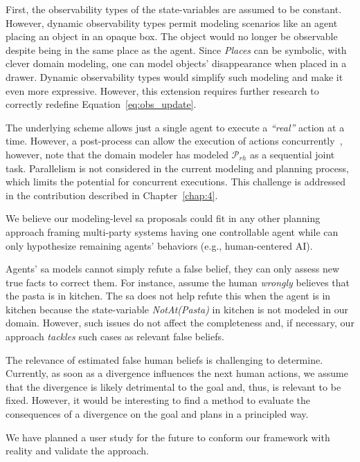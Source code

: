 {First, the observability types of the state-variables are assumed to be constant. 
However, dynamic observability types permit modeling scenarios like an agent placing an object in an opaque box. The object would no longer be observable despite being in the same place as the agent. Since \textit{Places} can be symbolic, with clever domain modeling, one can model objects' disappearance when placed in a drawer. Dynamic observability types would simplify such modeling and make it even more expressive. However, this extension requires further research to correctly redefine Equation~\ref{eq:obs_update}. 

The underlying scheme allows just a single agent to execute a \textit{``real''} action at a time. 
However, a post-process can allow the execution of actions concurrently~\cite{CrosbyJR14}, however, note that the domain modeler has modeled $\mathcal{P}_{rh}$ as a sequential joint task. 
Parallelism is not considered in the current modeling and planning process, which limits the potential for concurrent executions. This challenge is addressed in the contribution described in Chapter~\ref{chap:4}.

We believe our modeling-level \acrshort{sa} proposals could fit in any other planning approach framing multi-party systems having one controllable agent while can only hypothesize remaining agents' behaviors (e.g., human-centered AI).

Agents' \acrshort{sa} models cannot simply refute a false belief, they can only assess new true facts to correct them.
For instance, assume the human \textit{wrongly} believes that the pasta is in \textsf{kitchen}. The \acrshort{sa} does not help refute this when the agent is in \textsf{kitchen}
because the state-variable \textit{NotAt(Pasta)} in \textsf{kitchen} is not modeled in our domain.  
However, such issues do not affect the completeness and, if necessary, our approach \textit{tackles} such cases as relevant false beliefs.

The relevance of estimated false human beliefs is challenging to determine. Currently, as soon as a divergence influences the next human actions, we assume that the divergence is likely detrimental to the goal and, thus, is relevant to be fixed. However, it would be interesting to find a method to evaluate the consequences of a divergence on the goal and plans in a principled way.

We have planned a user study for the future to conform our framework with reality and validate the approach.

}
